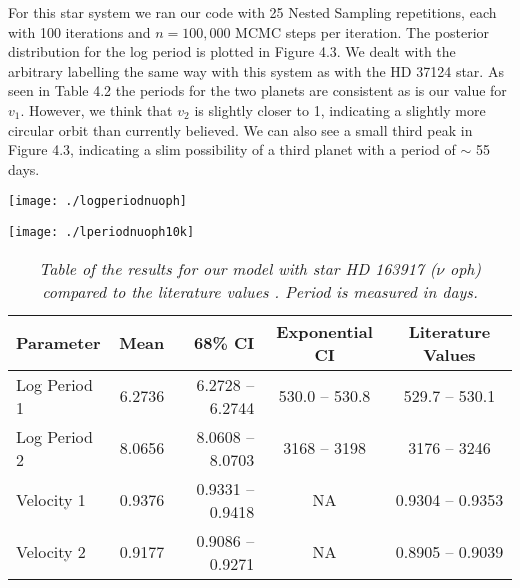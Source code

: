 For this star system we ran our code with 25 Nested Sampling repetitions, each with 100 iterations and $n = 100,000$ MCMC steps per iteration. The posterior distribution for the log period is plotted in Figure 4.3. We dealt with the arbitrary labelling the same way with this system as with the HD 37124 star. As seen in Table 4.2 the periods for the two planets are consistent as is our value for $v_1$. However, we think that $v_2$ is slightly closer to 1, indicating a slightly more circular orbit than currently believed. We can also see a small third peak in Figure 4.3, indicating a slim possibility of a third planet with a period of $\sim$ 55 days.

 
\noindent
\begin{minipage}{\linewidth}%
\centering
\texttt{[image: ./logperiodnuoph]}
\label{fig:LpPostnu}
\end{minipage}


 
\noindent
\begin{minipage}{\linewidth}%
\centering
\texttt{[image: ./lperiodnuoph10k]}
\label{fig:LpPostnushort}
\end{minipage}



\begin{table}[hbtp]
\centering
\begin{tabular}{|l|r|r|c|c|}
\hline
Parameter & Mean & 68\% CI & Exponential CI & Literature Values \\ \hline
Log Period 1 & 6.2736 & 6.2728 -- 6.2744 & 530.0 -- 530.8 & 529.7 -- 530.1\\
Log Period 2 & 8.0656 & 8.0608 -- 8.0703 & 3168 -- 3198 & 3176 -- 3246\\
Velocity 1 & 0.9376 & 0.9331 -- 0.9418 &  NA & 0.9304 -- 0.9353\\
Velocity 2 & 0.9177 & 0.9086 -- 0.9271 &  NA & 0.8905 -- 0.9039\\
\hline
\end{tabular}
\caption[Table 2]{\textit{Table of the results for our model with star HD 163917 ($\nu$ oph) compared to the literature values \cite{2014arXiv1401.6128H}. Period is measured in days.}}
\end{table}

